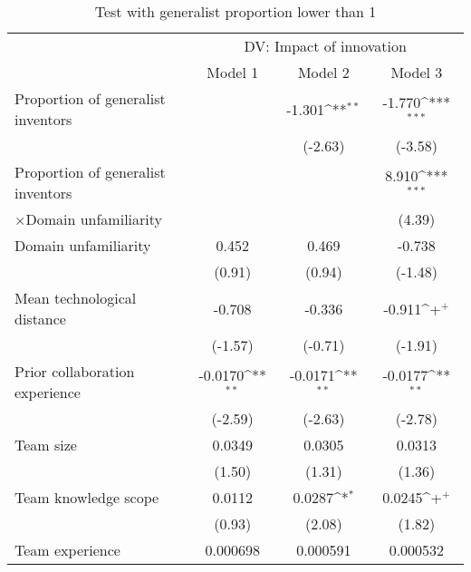 \begin{table}[htbp]\centering
\def\sym#1{\ifmmode^{#1}\else\(^{#1}\)\fi}
\caption{Test with generalist proportion lower than 1\label{notallgen}}
\begin{tabular}{l*{3}{c}}
    \toprule
    &\multicolumn{3}{c}{DV: Impact of innovation}\\
    \cmidrule(lr){2-4}
    &\multicolumn{1}{c}{Model 1}&\multicolumn{1}{c}{Model 2}&\multicolumn{1}{c}{Model 3}\\
    \midrule
Proportion of generalist inventors&                     &      -1.301\sym{**} &      -1.770\sym{***}\\
                    &                     &     (-2.63)         &     (-3.58)         \\
\addlinespace
Proportion of generalist inventors&                     &                     &       8.910\sym{***}\\
$\times$Domain unfamiliarity                    &                     &                     &      (4.39)         \\
\addlinespace
Domain unfamiliarity&       0.452         &       0.469         &      -0.738         \\
                    &      (0.91)         &      (0.94)         &     (-1.48)         \\
\addlinespace
Mean technological distance&      -0.708         &      -0.336         &      -0.911\sym{+}  \\
                    &     (-1.57)         &     (-0.71)         &     (-1.91)         \\
\addlinespace
Prior collaboration experience&     -0.0170\sym{**} &     -0.0171\sym{**} &     -0.0177\sym{**} \\
                    &     (-2.59)         &     (-2.63)         &     (-2.78)         \\
\addlinespace
Team size           &      0.0349         &      0.0305         &      0.0313         \\
                    &      (1.50)         &      (1.31)         &      (1.36)         \\
\addlinespace
Team knowledge scope&      0.0112         &      0.0287\sym{*}  &      0.0245\sym{+}  \\
                    &      (0.93)         &      (2.08)         &      (1.82)         \\
\addlinespace
Team experience     &    0.000698         &    0.000591         &    0.000532         \\

\end{tabular}
\end{table}
